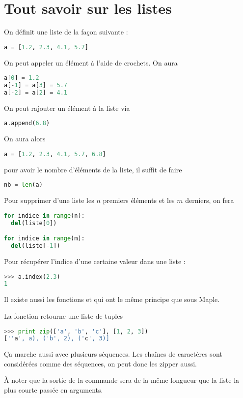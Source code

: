 \documentclass[a4paper,twoside]{article}
\begin{document}
\section{Tout savoir sur les listes}
On définit une liste de la façon suivante :
\begin{lstlisting}[language=python]
a = [1.2, 2.3, 4.1, 5.7]
\end{lstlisting}

On peut appeler un élément à l'aide de crochets. On aura
\begin{lstlisting}[language=python]
a[0] = 1.2
a[-1] = a[3] = 5.7
a[-2] = a[2] = 4.1
\end{lstlisting}

On peut rajouter un élément à la liste via
\begin{lstlisting}[language=python]
a.append(6.8)
\end{lstlisting}
On aura alors
\begin{lstlisting}[language=python]
a = [1.2, 2.3, 4.1, 5.7, 6.8]
\end{lstlisting}

pour avoir le nombre d'éléments de la liste, il suffit de faire
\begin{lstlisting}[language=python]
nb = len(a)
\end{lstlisting}

Pour supprimer d'une liste les $n$ premiers éléments et les $m$ derniers, on fera
\begin{lstlisting}[language=python]
for indice in range(n):
  del(liste[0])

for indice in range(m):
  del(liste[-1])
\end{lstlisting}

Pour récupérer l'indice d'une certaine valeur dans une liste :
\begin{lstlisting}[language=python]
>>> a.index(2.3)
1
\end{lstlisting}


\bigskip

Il existe aussi les fonctions  et  qui ont le même principe que sous Maple.

La fonction  retourne une liste de tuples
\begin{lstlisting}[language=python]
>>> print zip(['a', 'b', 'c'], [1, 2, 3])
[''a', a), ('b', 2), ('c', 3)]
\end{lstlisting}

\begin{remarque}
Ça marche aussi avec plusieurs séquences. Les chaînes de caractères sont considérées comme des séquences, on peut donc les zipper aussi.

À noter que la sortie de la commande sera de la même longueur que la liste la plus courte passée en arguments.
\end{remarque}
\end{document}
